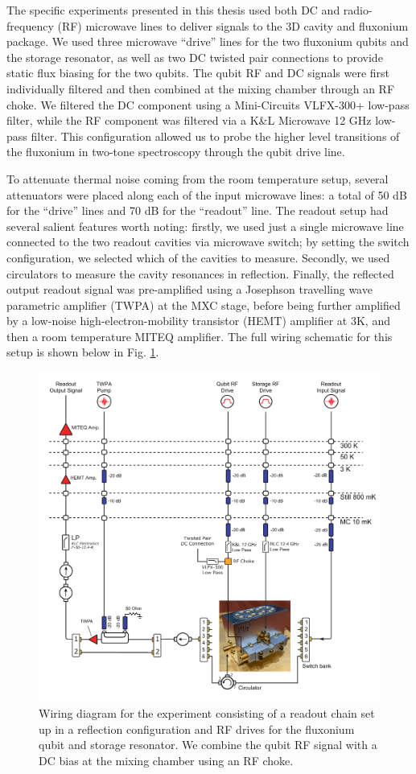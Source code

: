 The specific experiments presented in this thesis used both DC and radio-frequency (RF) microwave lines to deliver signals to the 3D cavity and fluxonium package. We used three microwave ``drive'' lines for the two fluxonium qubits and the storage resonator, as well as two DC twisted pair connections to provide static flux biasing for the two qubits. The qubit RF and DC signals were first individually filtered and then combined at the mixing chamber through an RF choke. We filtered the DC component using a Mini-Circuits VLFX-300+ low-pass filter, while the RF component was filtered via a K\&L Microwave 12 GHz low-pass filter. This configuration allowed us to probe the higher level transitions of the fluxonium in two-tone spectroscopy through the qubit drive line. 

To attenuate thermal noise coming from the room temperature setup, several attenuators were placed along each of the input microwave lines: a total of 50 dB for the ``drive'' lines and 70 dB for the ``readout'' line. The readout setup had several salient features worth noting: firstly, we used just a single microwave line connected to the two readout cavities via microwave switch; by setting the switch configuration, we selected which of the cavities to measure. Secondly, we used circulators to measure the cavity resonances in reflection. Finally, the reflected output readout signal was pre-amplified using a Josephson travelling wave parametric amplifier (TWPA) at the MXC stage, before being further amplified by a low-noise high-electron-mobility transistor (HEMT) amplifier at 3K, and then a room temperature MITEQ amplifier. The full wiring schematic for this setup is shown below in Fig. \ref{fig:4-microwave-wiring-diagram}. 

\begin{figure}[h]
    \centering
    \includegraphics[width=0.85\linewidth]{Figures/4/Microwave-Wiring-Diagram.pdf}
    \caption{Wiring diagram for the experiment consisting of a readout chain set up in a reflection configuration and RF drives for the fluxonium qubit and storage resonator. We combine the qubit RF signal with a DC bias at the mixing chamber using an RF choke.}
    \label{fig:4-microwave-wiring-diagram}
\end{figure}


